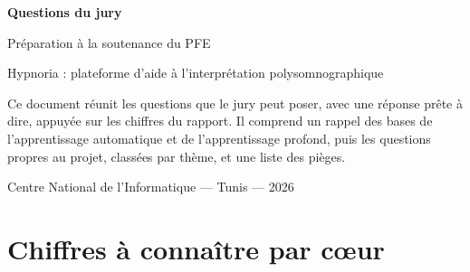 \documentclass[11pt,a4paper]{report}
\begin{document}
\begin{titlepage}
\centering
\vspace*{3cm}
{\Huge\bfseries\color{bleu} Questions du jury\par}
\vspace{0.6cm}
{\Large Préparation à la soutenance du PFE\par}
\vspace{0.4cm}
{\large Hypnoria : plateforme d'aide à l'interprétation polysomnographique\par}
\vspace{1.5cm}
\begin{minipage}{0.8\textwidth}\centering\color{gris}
Ce document réunit les questions que le jury peut poser, avec une réponse prête à dire,
appuyée sur les chiffres du rapport. Il comprend un rappel des bases de l'apprentissage
automatique et de l'apprentissage profond, puis les questions propres au projet, classées
par thème, et une liste des pièges.
\end{minipage}
\vfill
{\small Centre National de l'Informatique --- Tunis --- 2026}
\end{titlepage}

\tableofcontents
\newpage

\chapter{Chiffres à connaître par cœur}
\end{document}
